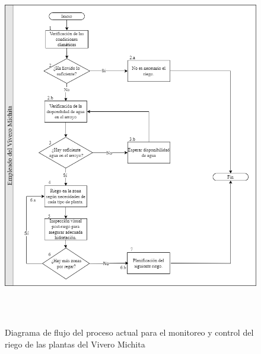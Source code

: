 \begin{figure}[H]
    \centering
    \includegraphics[width=14cm,height=16cm,keepaspectratio]{resources/images/Diagrama-flujo-proceso-actual.png}
    \caption{Diagrama de flujo del proceso actual para el monitoreo y control del riego de las plantas del Vivero Michita}\label{fig:proceso_actual}
\end{figure}


